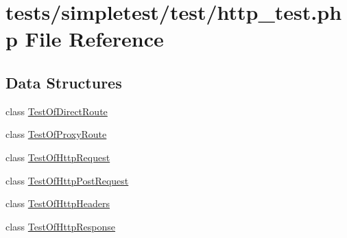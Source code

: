 \hypertarget{http__test_8php}{\section{tests/simpletest/test/http\-\_\-test.php File Reference}
\label{http__test_8php}
}
\subsection*{Data Structures}
\begin{DoxyCompactItemize}
\item 
class \hyperlink{class_test_of_direct_route}{Test\-Of\-Direct\-Route}
\item 
class \hyperlink{class_test_of_proxy_route}{Test\-Of\-Proxy\-Route}
\item 
class \hyperlink{class_test_of_http_request}{Test\-Of\-Http\-Request}
\item 
class \hyperlink{class_test_of_http_post_request}{Test\-Of\-Http\-Post\-Request}
\item 
class \hyperlink{class_test_of_http_headers}{Test\-Of\-Http\-Headers}
\item 
class \hyperlink{class_test_of_http_response}{Test\-Of\-Http\-Response}
\end{DoxyCompactItemize}
